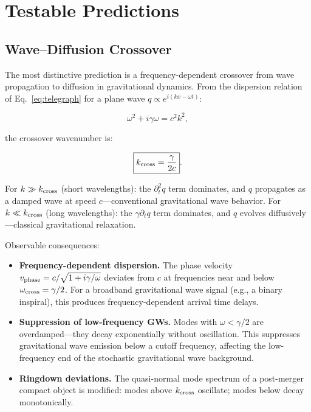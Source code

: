 \documentclass[aps,prd,twocolumn,showpacs,superscriptaddress,preprintnumbers]{revtex4-2}
\begin{document}
\section{Testable Predictions}
\label{sec:predictions}

\subsection{Wave--Diffusion Crossover}

The most distinctive prediction is a frequency-dependent crossover from wave propagation to diffusion in gravitational dynamics.
From the dispersion relation of Eq.~\eqref{eq:telegraph} for a plane wave $q\propto e^{i(kx-\omega t)}$:

\begin{equation}
\omega^2 + i\gamma\omega = c^2 k^2,
\label{eq:dispersion}
\end{equation}

the crossover wavenumber is:

\begin{equation}
\boxed{k_{\rm cross} = \frac{\gamma}{2c}}.
\label{eq:kcross}
\end{equation}

For $k\gg k_{\rm cross}$ (short wavelengths): the $\partial_t^2 q$ term dominates, and $q$ propagates as a damped wave at speed $c$---conventional gravitational wave behavior.
For $k\ll k_{\rm cross}$ (long wavelengths): the $\gamma\partial_t q$ term dominates, and $q$ evolves diffusively---classical gravitational relaxation.

Observable consequences:
\begin{itemize}
    \item \textbf{Frequency-dependent dispersion.} The phase velocity $v_{\rm phase}=c/\sqrt{1+i\gamma/\omega}$ deviates from $c$ at frequencies near and below $\omega_{\rm cross}=\gamma/2$. For a broadband gravitational wave signal (e.g., a binary inspiral), this produces frequency-dependent arrival time delays.

    \item \textbf{Suppression of low-frequency GWs.} Modes with $\omega<\gamma/2$ are overdamped---they decay exponentially without oscillation.
    This suppresses gravitational wave emission below a cutoff frequency, affecting the low-frequency end of the stochastic gravitational wave background.

    \item \textbf{Ringdown deviations.} The quasi-normal mode spectrum of a post-merger compact object is modified: modes above $k_{\rm cross}$ oscillate; modes below decay monotonically.
\end{itemize}
\end{document}

